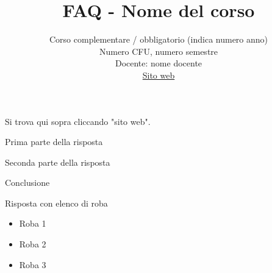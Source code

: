 \documentclass{article}
\title{FAQ - \textbf{Nome del corso}}
\author{
	Corso complementare / obbligatorio (indica numero anno)\\Numero CFU, numero semestre\\
	Docente: nome docente\\ 
	\href{}{Sito web}
	\date{}
}
\begin{document}
 
\maketitle

\begin{QuestionList}

     {
        Si trova qui sopra cliccando "sito web".
    }
	
     {
        Prima parte della risposta 

        Seconda parte della risposta 

        Conclusione 
    }


     {
        Risposta con elenco di roba
        \begin{itemize}
        	\item Roba 1
        	\item Roba 2
        	\item Roba 3
        \end{itemize}
    }
 
\end{QuestionList}
\end{document}
